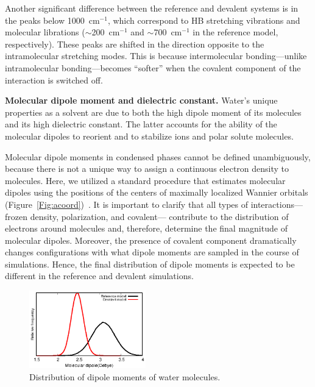 \documentclass[journal=jacsat,manuscript=article]{achemso}
\begin{document}
Another significant difference between the reference and devalent systems is in the peaks below 1000~cm$^{-1}$, which correspond to HB stretching vibrations and molecular librations ($\sim$200~cm$^{-1}$ and $\sim$700~cm$^{-1}$ in the reference model, respectively). These peaks are shifted in the direction opposite to the intramolecular stretching modes. This is because intermolecular bonding---unlike intramolecular bonding---becomes ``softer'' when the covalent component of the interaction is switched off.%

\textbf{Molecular dipole moment and dielectric constant.} Water's unique properties as a solvent are due to both the high dipole moment of its molecules and its high dielectric constant. 
The latter accounts for the ability of the molecular dipoles to reorient and to stabilize ions and polar solute molecules. 

Molecular dipole moments in condensed phases cannot be defined unambiguously, because there is not a unique way to assign a continuous electron density to molecules.
Here, we utilized a standard procedure that estimates molecular dipoles using the positions of the centers of maximally localized Wannier orbitals (Figure~\ref{Fig:acoord})~\cite{marzari1997maximally,sharma2007dipolar}. 
It is important to clarify that all types of interactions---frozen density, polarization, and covalent--- contribute to the distribution of electrons around molecules and, therefore, determine the final magnitude of molecular dipoles. 
Moreover, the presence of covalent component dramatically changes configurations with what dipole moments are sampled in the course of simulations. 
Hence, the final distribution of dipole moments is expected to be different in the reference and devalent simulations. 

\begin{figure}
\includegraphics[width=0.45\textwidth]{new_dipole}
\caption{Distribution of dipole moments of water molecules.} \label{Fig:dipoledist}
\end{figure}
\end{document}
